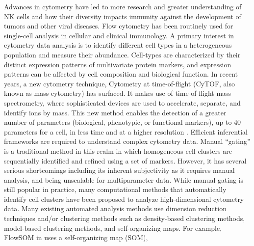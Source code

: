 \documentclass[12pt,]{article}
\begin{document}
Advances in cytometry have led to more research and greater understanding of NK
cells and how their diversity impacts immunity against the development of
tumors and other viral diseases.  Flow cytometry has been routinely used for
single-cell analysis in cellular and clinical immunology.  A primary
interest in cytometry data analysis is to identify different cell types in a
heterogeneous population and measure their abundance.  Cell-types are
characterized by their distinct expression patterns of multivariate protein
markers, and expression patterns can be affected by cell composition and
biological function.
In recent years, a new cytometry technique, Cytometry at time-of-flight (CyTOF,
also known as mass cytometry) has surfaced.  It makes use of time-of-flight
mass spectrometry, where sophisticated devices are used to accelerate,
separate, and identify ions by mass. This new method enables the detection of a
greater number of parameters (biological, phenotypic, or functional markers), up
to 40 parameters for a cell, in less time and at a higher resolution
\citep{cheung2011screening}. 
Efficient inferential frameworks are required to understand complex cytometry
data.  Manual ``gating'' is a traditional method in this realm in which
homogeneous cell-clusters are sequentially identified and refined using a set
of markers.  However, it has several serious shortcomings including its
inherent subjectivity as it requires manual analysis, and being unscalable for
multiparameter data.  While manual gating is still popular in practice, many
computational methods that automatically identify cell clusters have been
proposed to analyze high-dimensional cytometry data.  
Many existing automated analysis methods use dimension reduction techniques
and/or clustering methods such as density-based clustering methods, model-based
clustering methods, and self-organizing maps.
For example, FlowSOM in \cite{van2015flowsom} uses a self-organizing map (SOM),
\end{document}
